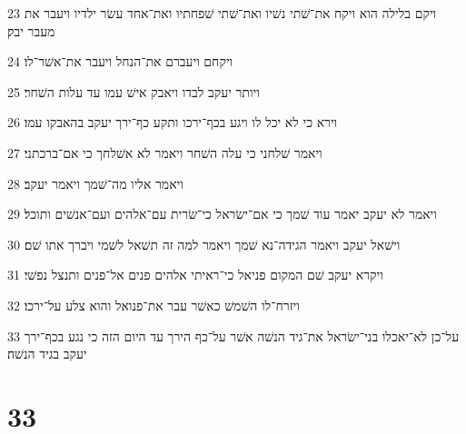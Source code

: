 \par 23 ויקם בלילה הוא ויקח את־שׁתי נשׁיו ואת־שׁתי שׁפחתיו ואת־אחד עשׂר ילדיו ויעבר את מעבר יבק׃
\par 24 ויקחם ויעברם את־הנחל ויעבר את־אשׁר־לו׃
\par 25 ויותר יעקב לבדו ויאבק אישׁ עמו עד עלות השׁחר׃
\par 26 וירא כי לא יכל לו ויגע בכף־ירכו ותקע כף־ירך יעקב בהאבקו עמו׃
\par 27 ויאמר שׁלחני כי עלה השׁחר ויאמר לא אשׁלחך כי אם־ברכתני׃
\par 28 ויאמר אליו מה־שׁמך ויאמר יעקב׃
\par 29 ויאמר לא יעקב יאמר עוד שׁמך כי אם־ישׂראל כי־שׂרית עם־אלהים ועם־אנשׁים ותוכל׃
\par 30 וישׁאל יעקב ויאמר הגידה־נא שׁמך ויאמר למה זה תשׁאל לשׁמי ויברך אתו שׁם׃
\par 31 ויקרא יעקב שׁם המקום פניאל כי־ראיתי אלהים פנים אל־פנים ותנצל נפשׁי׃
\par 32 ויזרח־לו השׁמשׁ כאשׁר עבר את־פנואל והוא צלע על־ירכו׃
\par 33 על־כן לא־יאכלו בני־ישׂראל את־גיד הנשׁה אשׁר על־כף הירך עד היום הזה כי נגע בכף־ירך יעקב בגיד הנשׁה׃

\chapter{33}

